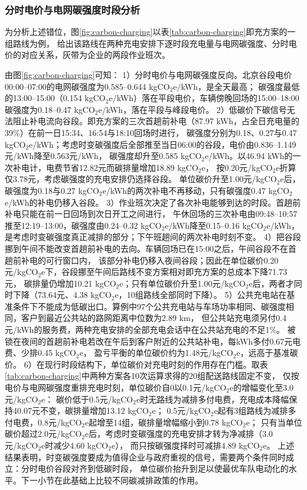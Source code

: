 \subsubsection{分时电价与电网碳强度时段分析}

为分析上述错位，图\ref{fig:carbon-charging}以表\ref{tab:carbon-charging}即充方案的一组路线为例，
给出该路线在两种充电安排下逐时段充电量与电网碳强度、分时电价的对应关系，灰带为企业的两段作业班次。


由图\ref{fig:carbon-charging}可知：
1）分时电价与电网碳强度反向。北京谷段电价00:00--07:00的电网碳强度为0.585--0.644 kgCO$_2$e/kWh，是全天最高；
碳强度最低的13:00--15:00（0.154 kgCO$_2$e/kWh）落在平段电价，车辆傍晚回场的15:00--18:00碳强度为0.18--0.47 kgCO$_2$e/kWh，落在平段与峰段电价。
2）低碳价下碳信号无法阻止补电流向谷段。即充方案的三次首趟前补电（87.97 kWh，占全日充电量的39\%）在前一日15:34、16:54与18:10回场时进行，
碳强度分别为0.18、0.27与0.47 kgCO$_2$e/kWh；考虑时变碳强度后全部推至当日06:00的谷段，电价由0.836--1.149元/kWh降至0.563元/kWh，
碳强度却升至0.585 kgCO$_2$e/kWh。以46.94 kWh的一次补电计，电费节省12.82元而碳排量增加18.89 kgCO$_2$e，
按0.20元/kgCO$_2$e折算仅3.78元，考虑碳强度的充电安排仍选择谷段。
单位碳价升至1.00元/kgCO$_2$e后，碳强度为0.18与0.27 kgCO$_2$e/kWh的两次补电不再移动，只有碳强度0.47 kgCO$_2$e/kWh的补电仍移入谷段。
3）作业班次决定了各次补电能够到达的时段。首趟前补电只能在前一日回场到次日开工之间进行，
午休回场的三次补电由09:48--10:57推至12:19--13:00，碳强度由0.24--0.32 kgCO$_2$e/kWh降至0.15--0.16 kgCO$_2$e/kWh，
是考虑时变碳强度真正减排的部分；下午班趟间的两次补电时刻不变。
4）把谷段挪到午间不能改变首趟前补电的去向。车辆回场已在15:00之后，午间谷段不在首趟前补电的可行窗口内，
该部分补电仍移入夜间谷段；因此在单位碳价0.20元/kgCO$_2$e下，谷段挪至午间后路线不变方案相对即充方案的总成本下降71.73元，
碳排量仍增加10.21 kgCO$_2$e；只有单位碳价升至1.00元/kgCO$_2$e后，两者才同时下降（73.64元、4.38 kgCO$_2$e，10组路线全部同时下降）。
5）公共充电站在基准条件下不能成为低碳出口。算例中97个公共充电站与车场功率相同、碳强度相同，客户到最近公共站的路网距离中位数为2.89 km，
但公共站充电须另付0.4元/kWh的服务费，两种充电安排的全部充电会话中在公共站充电的不足1\%。
被锁在夜间的首趟前补电若改在午后到客户附近的公共站补电，每kWh多付0.67元电费、少排0.45 kgCO$_2$e，
盈亏平衡的单位碳价约为1.48元/kgCO$_2$e，远高于基准碳价。
6）在现行时段结构下，单位碳价对充电时刻的作用存在门槛。取表\ref{tab:carbon-charging}中两种方案各10次运算求得的20组配送路线固定不变，
仅按电价与电网碳强度重排充电时刻，单位碳价自0以0.1元/kgCO$_2$e的增幅变化至3.0元/kgCO$_2$e：
碳价低于0.5元/kgCO$_2$e时无路线为减排多付电费，充电成本降幅保持40.07元不变，碳排量增加13.12 kgCO$_2$e；
0.5元/kgCO$_2$e起有3组路线为减排多付电费，0.8元/kgCO$_2$e起增至14组，碳排量增幅缩小到0.78 kgCO$_2$e；
只有当单位碳价超过2.0元/kgCO$_2$e后，考虑时变碳强度的充电安排才转为净减排（3.0元/kgCO$_2$e时减少4.60 kgCO$_2$e），
而只按碳强度择时可减排4.89 kgCO$_2$e。
上述结果表明，时变碳强度要成为值得企业与政府重视的信号，需要两个条件同时成立：分时电价谷段对齐到低碳时段，
单位碳价抬升到足以使最优车队电动化的水平。下一小节在此基础上比较不同碳减排政策的作用。

